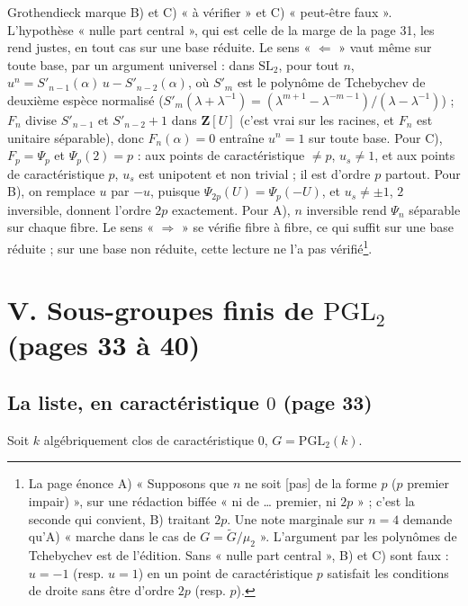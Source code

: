 \documentclass[11pt,a4paper]{article}
\begin{document}
Grothendieck marque B) et C) « à vérifier » et C) « peut-être faux ».
L'hypothèse « nulle part central », qui est celle de la marge de la page 31,
les rend justes, en tout cas sur une base réduite. Le sens « $\Leftarrow$ » vaut
même sur toute base, par un argument universel : dans $\mathrm{SL}_2$, pour
tout $n$, $u^n = S'_{n-1}(\alpha)\, u - S'_{n-2}(\alpha)$, où $S'_m$ est le
polynôme de Tchebychev de deuxième espèce normalisé ($S'_m(\lambda +
\lambda^{-1}) = (\lambda^{m+1} - \lambda^{-m-1})/(\lambda - \lambda^{-1})$) ;
$F_n$ divise $S'_{n-1}$ et $S'_{n-2} + 1$ dans $\mathbf{Z}[U]$ (c'est vrai sur
les racines, et $F_n$ est unitaire séparable), donc $F_n(\alpha) = 0$ entraîne
$u^n = 1$ sur toute base. Pour C), $F_p = \Psi_p$ et $\Psi_p(2) = p$ : aux points
de caractéristique $\neq p$, $u_s \neq 1$, et aux points de caractéristique $p$,
$u_s$ est unipotent et non trivial ; il est d'ordre $p$ partout. Pour B), on
remplace $u$ par $-u$, puisque $\Psi_{2p}(U) = \Psi_p(-U)$, et $u_s \neq \pm 1$,
$2$ inversible, donnent l'ordre $2p$ exactement. Pour A), $n$ inversible rend
$\Psi_n$ séparable sur chaque fibre. Le sens « $\Rightarrow$ » se vérifie
fibre à fibre, ce qui suffit sur une base réduite ; sur une base non réduite,
cette lecture ne l'a pas vérifié\footnote{La page énonce A) « Supposons
que $n$ ne soit [pas] de la forme $p$ ($p$ premier impair) », sur une
rédaction biffée « ni de \ldots{} premier, ni $2p$ » ; c'est la seconde qui
convient, B) traitant $2p$. Une note marginale sur $n = 4$ demande qu'A)
« marche dans le cas de $G = \widetilde{G}/\mu_2$ ». L'argument par les
polynômes de Tchebychev est de l'édition. Sans « nulle part central », B) et
C) sont faux : $u = -1$ (resp. $u = 1$) en un point de caractéristique $p$
satisfait les conditions de droite sans être d'ordre $2p$ (resp. $p$).}.

\section*{V. Sous-groupes finis de $\mathrm{PGL}_2$ (pages 33 à 40)}

\subsection*{La liste, en caractéristique $0$ (page 33)}

Soit $k$ algébriquement clos de caractéristique $0$, $G = \mathrm{PGL}_2(k)$.
\end{document}
